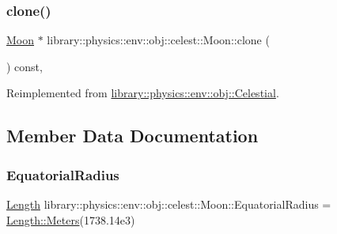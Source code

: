 \subsubsection{\texorpdfstring{clone()}{clone()}}
{\footnotesize\ttfamily \hyperlink{classlibrary_1_1physics_1_1env_1_1obj_1_1celest_1_1_moon}{Moon} $\ast$ library\+::physics\+::env\+::obj\+::celest\+::\+Moon\+::clone (\begin{DoxyParamCaption}{ }\end{DoxyParamCaption}) const\hspace{0.3cm}{\ttfamily [override]}, {\ttfamily [virtual]}}



Reimplemented from \hyperlink{classlibrary_1_1physics_1_1env_1_1obj_1_1_celestial_aaf8aa41a0ff9336eba62c07e3c27f82d}{library\+::physics\+::env\+::obj\+::\+Celestial}.



\subsection{Member Data Documentation}
\mbox{\label{classlibrary_1_1physics_1_1env_1_1obj_1_1celest_1_1_moon_a6b22597902ccee09be70ae4eecca2174}} 
\subsubsection{\texorpdfstring{Equatorial\+Radius}{EquatorialRadius}}
{\footnotesize\ttfamily \hyperlink{classlibrary_1_1physics_1_1units_1_1_length}{Length} library\+::physics\+::env\+::obj\+::celest\+::\+Moon\+::\+Equatorial\+Radius = \hyperlink{classlibrary_1_1physics_1_1units_1_1_length_ad523a3737d5c3f23a64588eac83f2148}{Length\+::\+Meters}(1738.\+14e3)\hspace{0.3cm}{\ttfamily [static]}}

\mbox{\label{classlibrary_1_1physics_1_1env_1_1obj_1_1celest_1_1_moon_a02e660fcf1bf06697a037a354f698499}} 
